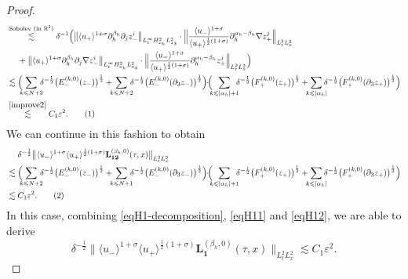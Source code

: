 \documentclass[10pt,reqno]{amsart}
\numberwithin{equation}{section}
\begin{document}
\begin{proof}
\begin{align*}
		&\stackrel{\text{Sobolev (in $\mathbb{R}^2$)}}{\lesssim}\delta^{-1}\Big(\big\|\langle u_+\rangle^{1+\sigma}\partial_{h}^{\beta_h}\partial_jz_-^i\big\|_{L^\infty_tH^2_{x_h}L^2_{x_3}}\cdot\Big\|\frac{\langle u_-\rangle^{1+\sigma}}{\langle u_+\rangle^{\frac{1}{2}(1+\sigma)}}\partial_{h}^{\alpha_h-\beta_h}\nabla z_+^j\Big\|_{L^2_tL^2_x}\\
		&\ \ \ \ +\big\|\langle u_+\rangle^{1+\sigma}\partial_{h}^{\beta_h}\partial_j\nabla z_-^i\big\|_{L^\infty_tH^2_{x_h}L^2_{x_3}}\cdot\Big\|\frac{\langle u_-\rangle^{1+\sigma}}{\langle u_+\rangle^{\frac{1}{2}(1+\sigma)}}\partial_{h}^{\alpha_h-\beta_h} z_+^j\Big\|_{L^2_tL^2_x}\Big)\\
		&\lesssim \Big(\!\!\!\sum_{k\leqslant N+3}\!\!\!\delta^{-\frac{1}{2}}\big(E_-^{(k,0)}(z_-)\big)^{\frac{1}{2}}+\!\!\!\sum_{k\leqslant N+2}\!\!\!\delta^{-\frac{1}{2}}\big(E_-^{(k,0)}(\partial_3z_-)\big)^{\frac{1}{2}}\Big) 
	 \!\!\cdot\!\!\Big(\!\!\!\sum_{k\leqslant|\alpha_h|+1}\!\!\!\delta^{-\frac{1}{2}}\big(F_+^{(k,0)}(z_+)\big)^{\frac{1}{2}}+\!\!\!\sum_{k\leqslant|\alpha_h|}\!\!\!\delta^{-\frac{1}{2}}\big(F_+^{(k,0)}(\partial_3z_+)\big)^{\frac{1}{2}}\Big)\\
		&\stackrel{\eqref{improve2}}{\lesssim} C_1\varepsilon^2.\stepcounter{equation}\tag{\theequation}\label{eqH11}
	\end{align*}
	We can continue in this fashion to obtain   
	\begin{align*}
		&\ \ \ \ \delta^{-\frac{1}{2}}\big\|\langle u_-\rangle^{1+\sigma}\langle u_+\rangle^{\frac{1}{2}(1+\sigma)}\mathbf{L}_{\mathbf{12}}^{(\beta_h,0)}(\tau,x)\big\|_{L^2_tL^2_x}\\
		&\lesssim \Big(\!\!\!\sum_{k\leqslant N+2}\!\!\!\delta^{-\frac{1}{2}}\big(E_-^{(k,0)}(z_-)\big)^{\frac{1}{2}}+\!\!\!\sum_{k\leqslant N+1}\!\!\!\delta^{-\frac{1}{2}}\big(E_-^{(k,0)}(\partial_3z_-)\big)^{\frac{1}{2}}\Big) 
		\!\! \cdot\!\!\Big(\!\!\!\sum_{k\leqslant|\alpha_h|+1}\!\!\!\delta^{-\frac{1}{2}}\big(F_+^{(k,0)}(z_+)\big)^{\frac{1}{2}}+\!\!\!\sum_{k\leqslant|\alpha_h|}\!\!\!\delta^{-\frac{1}{2}}\big(F_+^{(k,0)}(\partial_3z_+)\big)^{\frac{1}{2}}\Big)\\		&\lesssim C_1\varepsilon^2.	\stepcounter{equation}\tag{\theequation}\label{eqH12}
	\end{align*}
	In this case, combining \eqref{eqH1-decomposition}, \eqref{eqH11} and \eqref{eqH12}, we are able to derive
	\begin{equation}\label{eqH1case1estimate} \delta^{-\frac{1}{2}}\big\|\langle u_-\rangle^{1+\sigma}\langle u_+\rangle^{\frac{1}{2}(1+\sigma)}\mathbf{L}_{\mathbf{1}}^{(\beta_h,0)}(\tau,x)\big\|_{L^2_tL^2_x}\lesssim
		C_1\varepsilon^2.
	\end{equation}
	

\end{proof}
\end{document}
